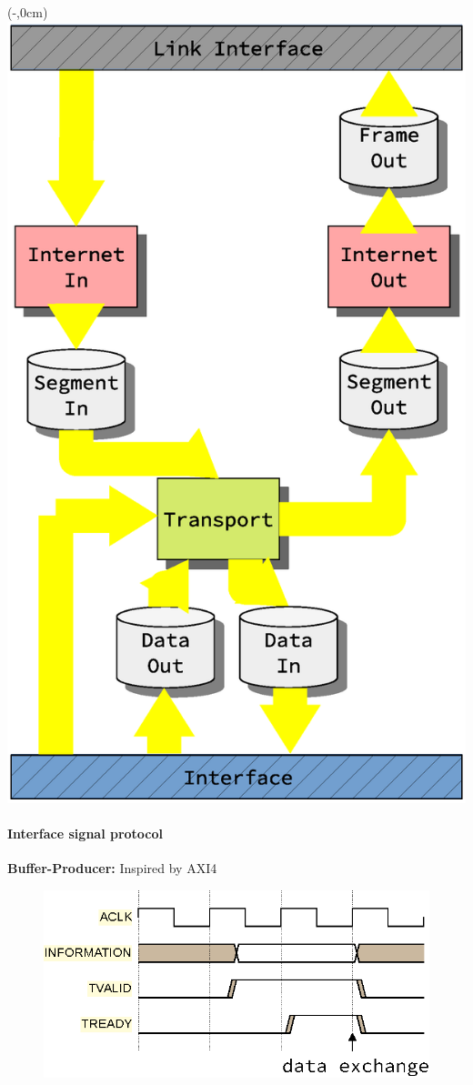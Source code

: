 \begin{frame}[fragile]
    \begin{textblock*}{\displayThumbnail}(\paperwidth-\displayThumbnail-0.2cm,0cm) %
        \colorbox{white}{\includegraphics[width=\textwidth]{implementation/design_2_busses.eps}}
    \end{textblock*}
    \frametitle{\ImplementationTitle}
    \framesubtitle{Interface signal protocol}
    \textbf{Buffer-Producer:} Inspired by AXI4\\
    \begin{figure}
                \includegraphics[scale=0.7]{implementation/axi4_handshake.eps}


\end{figure}
\end{frame}
